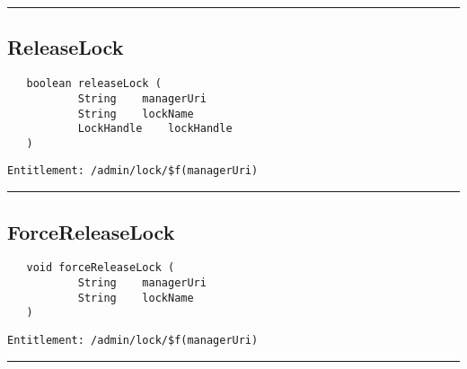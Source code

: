 \rule{12cm}{2pt}
\subsection{ReleaseLock}
\label{Api:ReleaseLock}
\begin{Verbatim}
   boolean releaseLock (
           String    managerUri
           String    lockName
           LockHandle    lockHandle
   )
\end{Verbatim}
\begin{Verbatim}[formatcom=\color{Maroon}]
  Entitlement: /admin/lock/$f(managerUri)
\end{Verbatim}



\rule{12cm}{2pt}
\subsection{ForceReleaseLock}
\label{Api:ForceReleaseLock}
\begin{Verbatim}
   void forceReleaseLock (
           String    managerUri
           String    lockName
   )
\end{Verbatim}
\begin{Verbatim}[formatcom=\color{Maroon}]
  Entitlement: /admin/lock/$f(managerUri)
\end{Verbatim}



\rule{12cm}{2pt}
